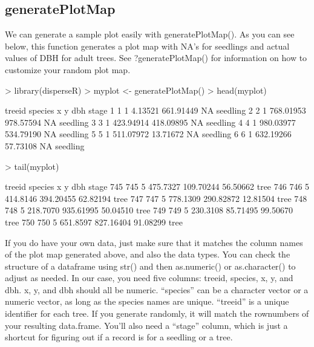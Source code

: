 \documentclass{report}
\begin{document}
\subsection{generatePlotMap}
We can generate a sample plot easily with generatePlotMap(). As you can see below, this function generates a plot map with NA's for seedlings and actual values of DBH for adult trees. See ?generatePlotMap() for information on how to customize your random plot map.
\begin{Schunk}
\begin{Sinput}
> library(disperseR)
> myplot <- generatePlotMap()
> head(myplot)
\end{Sinput}
\begin{Soutput}
  treeid species         x         y dbh    stage
1      1       1   4.13521 661.91449  NA seedling
2      2       1 768.01953 978.57594  NA seedling
3      3       1 423.94914 418.09895  NA seedling
4      4       1 980.03977 534.79190  NA seedling
5      5       1 511.07972  13.71672  NA seedling
6      6       1 632.19266  57.73108  NA seedling
\end{Soutput}
\begin{Sinput}
> tail(myplot)
\end{Sinput}
\begin{Soutput}
    treeid species        x         y      dbh stage
745    745       5 475.7327 109.70244 56.50662  tree
746    746       5 414.8146 394.20455 62.82194  tree
747    747       5 778.1309 290.82872 12.81504  tree
748    748       5 218.7070 935.61995 50.04510  tree
749    749       5 230.3108  85.71495 99.50670  tree
750    750       5 651.8597 827.16404 91.08299  tree
\end{Soutput}
\end{Schunk}

If you do have your own data, just make sure that it matches the column names of the plot map generated above, and also the data types. You can check the structure of a dataframe using str() and then as.numeric() or as.character() to adjust as needed. In our case, you need five columns: treeid, species, x, y, and dbh. x, y, and dbh should all be numeric. ``species'' can be a character vector or a numeric vector, as long as the species names are unique. ``treeid'' is a unique identifier for each tree. If you generate randomly, it will match the rownumbers of your resulting data.frame. You'll also need a ``stage'' column, which is just a shortcut for figuring out if a record is for a seedling or a tree.
\end{document}
